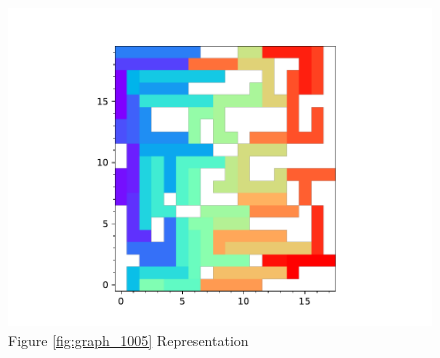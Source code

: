 \documentclass{standalone}
\begin{document}
\begin{figure}[!htb]
	\caption{Figure \ref{fig:graph_1005} Representation}
	\label{fig:picture_1005}
	\includegraphics[width=\textwidth]{../graphs/picture/1005.pdf}
\end{figure}
\end{document}
